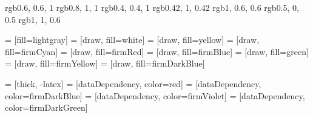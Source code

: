 \definecolor{firmBlue}     {rgb}{0.6,  0.6, 1   }
\definecolor{firmCyan}     {rgb}{0.8,  1,   1   }
\definecolor{firmDarkBlue} {rgb}{0.4,  0.4, 1   }
\definecolor{firmGreen}    {rgb}{0.42, 1,   0.42}
\definecolor{firmRed}      {rgb}{1,    0.6, 0.6 }
\definecolor{firmViolet}   {rgb}{0.5,  0,   0.5}
\definecolor{firmYellow}   {rgb}{1,    1,   0.6 }

      = [fill=lightgray]
       = [draw, fill=white]
      = [draw, fill=yellow]
      = [draw, fill=firmCyan]
    = [draw, fill=firmRed]
     = [draw, fill=firmBlue]
        = [draw, fill=green]
       = [draw, fill=firmYellow]
      = [draw, fill=firmDarkBlue]

    = [thick, -latex]
 = [dataDependency, color=red]
  = [dataDependency, color=firmDarkBlue]
              = [dataDependency, color=firmViolet]
        = [dataDependency, color=firmDarkGreen]
